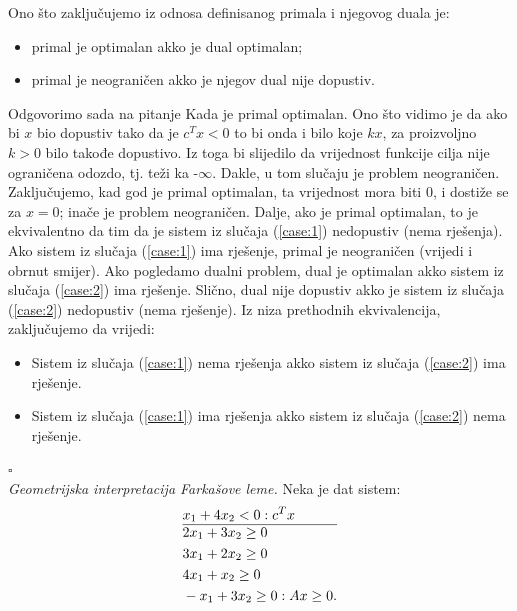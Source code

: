 \documentclass[a4paper, utf8, 11pt, colorlinks]{book}
\newenvironment{proof}{{Dokaz:}}{\hfill$\square$}
\begin{document}
\begin{proof}
  Ono što zaključujemo iz odnosa definisanog primala i njegovog duala je:
  \begin{itemize}
  	\item primal je optimalan akko je dual optimalan; 
  	\item primal je neograničen  akko je njegov dual nije dopustiv.  
  \end{itemize}
  Odgovorimo sada na pitanje Kada je primal optimalan. Ono što vidimo je da ako bi $x$ bio dopustiv tako da je $c^Tx < 0$ to bi onda i bilo koje $kx$, za proizvoljno $k>0$ bilo takođe dopustivo. Iz toga bi slijedilo da vrijednost funkcije cilja nije ograničena odozdo, tj. teži ka -$\infty$. Dakle, u tom slučaju je problem neograničen. Zaključujemo, kad god je primal optimalan, ta vrijednost mora biti 0, i dostiže se za $x =0$; inače je problem neograničen. Dalje, ako je primal optimalan, to  je ekvivalentno da tim da je sistem iz slučaja (\ref{case:1}) nedopustiv (nema rješenja).  Ako sistem iz slučaja (\ref{case:1}) ima rješenje, primal je neograničen (vrijedi i obrnut smijer). Ako pogledamo   dualni problem, dual je optimalan akko sistem iz  slučaja (\ref{case:2}) ima rješenje. Slično, dual nije dopustiv akko je sistem iz  slučaja (\ref{case:2}) nedopustiv (nema rješenje). Iz niza prethodnih ekvivalencija, zaključujemo da vrijedi: 
  \begin{itemize}
  	  \item Sistem iz  slučaja (\ref{case:1}) nema rješenja akko sistem iz  slučaja (\ref{case:2}) ima rješenje. 
  	  \item Sistem iz  slučaja (\ref{case:1}) ima rješenja akko sistem iz  slučaja (\ref{case:2}) nema rješenje. 
   \end{itemize}
\end{proof}\\

\emph{Geometrijska interpretacija Farkašove leme.}
Neka je dat sistem:
\begin{align*}
	&x_1 + 4 x_2  < 0: c^T x\\ \hline
	& 2 x_1 + 3 x_2 \geq 0 \\
	& 3 x_1 + 2 x_2 \geq 0 \\
	& 4 x_1 + x_2 \geq 0 \\
	& -x_1 + 3 x_2 \geq 0: Ax \geq 0.
\end{align*}
\end{document}
